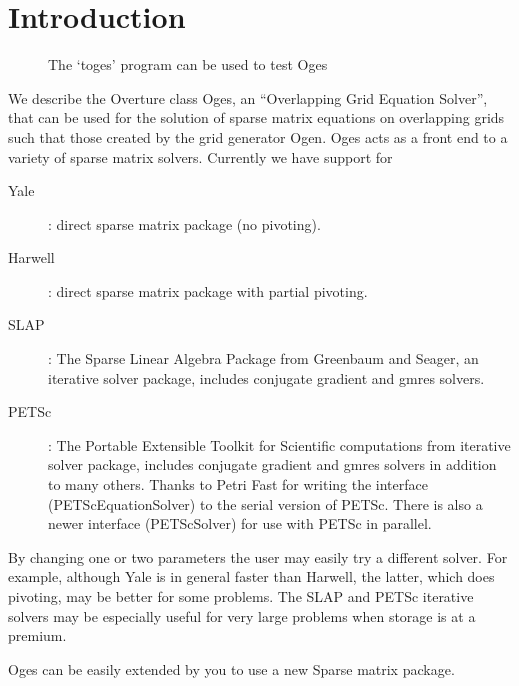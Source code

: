\documentclass[11pt]{article}
\newcommand{\Index}[1]{#1\index{#1}}
\begin{document}
\tableofcontents

\vfill\eject


\section{Introduction}

\begin{figure} 
  \begin{center}
  \caption{The `toges' program can be used to test Oges}
  \end{center} 
\end{figure}

We describe the Overture class Oges, an
``Overlapping Grid Equation Solver'', that can be used for the
solution of sparse matrix equations on overlapping grids such that
those created by the grid generator Ogen.  Oges acts as a front end to
a variety of sparse matrix solvers. Currently we have support for
\begin{description}
  \item[\Index{Yale}] : direct sparse matrix package (no pivoting).
  \item[\Index{Harwell}] : direct sparse matrix package with partial pivoting.
  \item[\Index{SLAP}] : The Sparse Linear Algebra Package
from Greenbaum and Seager, an  iterative solver package, includes conjugate gradient and gmres solvers.
  \item[\Index{PETSc}] : The Portable Extensible Toolkit for Scientific computations\cite{petsc-manual} from
     iterative solver package, includes conjugate gradient and gmres solvers
     in addition to many others. Thanks to Petri Fast for writing the interface (PETScEquationSolver) 
     to the serial version of PETSc. There is also a newer interface (PETScSolver) for use with PETSc in parallel. 
\end{description}
By changing one or two parameters
the user may easily try a different solver. For example,
although Yale is in general faster than Harwell, the latter,
 which does pivoting, may be better for some problems.
The SLAP and PETSc iterative solvers may be especially useful for very large
problems when storage is at a premium.

Oges can be easily extended by you to use a new Sparse matrix package. 
\end{document}
